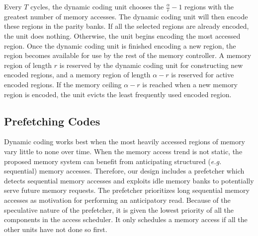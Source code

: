 Every $T$ cycles, the dynamic coding unit chooses the $\frac{\alpha}{r} - 1$ regions with the greatest number of memory accesses. The dynamic coding unit will then encode these regions in the parity banks. If all the selected regions are already encoded, the unit does nothing. Otherwise, the unit begins encoding the most accessed region. Once the dynamic coding unit is finished encoding a new region, the region becomes available for use by the rest of the memory controller. A memory region of length $r$ is reserved by the dynamic coding unit for constructing new encoded regions, and a memory region of length $\alpha - r$ is reserved for active encoded regions. If the memory ceiling $\alpha - r$ is reached when a new memory region is encoded, the unit evicts the least frequently used encoded region.

\subsection{Prefetching Codes}
\label{sec:prefetching}
Dynamic coding works best when the most heavily accessed regions of memory vary little to none over time. When the memory access trend is not static, the proposed memory system can benefit from anticipating structured (\textit{e.g.} sequential) memory accesses. Therefore, our design includes a prefetcher which detects sequential memory accesses and exploits idle memory banks to potentially serve future memory requests. The prefetcher prioritizes long sequential memory accesses as motivation for performing an anticipatory read. Because of the speculative nature of the prefetcher, it is given the lowest priority of all the components in the access scheduler. It only schedules a memory access if all the other units have not done so first. 